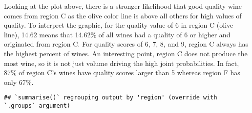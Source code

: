 \documentclass[
]{article}
\newenvironment{Shaded}{\begin{snugshade}}{\end{snugshade}}
\newcommand{\CommentTok}[1]{\textcolor[rgb]{0.56,0.35,0.01}{\textit{#1}}}
\newcommand{\DataTypeTok}[1]{\textcolor[rgb]{0.13,0.29,0.53}{#1}}
\newcommand{\DecValTok}[1]{\textcolor[rgb]{0.00,0.00,0.81}{#1}}
\newcommand{\KeywordTok}[1]{\textcolor[rgb]{0.13,0.29,0.53}{\textbf{#1}}}
\newcommand{\NormalTok}[1]{#1}
\newcommand{\OperatorTok}[1]{\textcolor[rgb]{0.81,0.36,0.00}{\textbf{#1}}}
\newcommand{\StringTok}[1]{\textcolor[rgb]{0.31,0.60,0.02}{#1}}
\begin{document}
Looking at the plot above, there is a stronger likelihood that good
quality wine comes from region C as the olive color line is above all
others for high values of quality. To interpret the graphic, for the
quality value of 6 in region C (olive line), 14.62 means that 14.62\% of
all wines had a quality of 6 or higher and originated from region C. For
quality scores of 6, 7, 8, and 9, region C always has the highest
percent of wines. An interesting point, region C does not produce the
most wine, so it is not just volume driving the high joint
probabilities. In fact, 87\% of region C's wines have quality scores
larger than 5 whereas region F has only 67\%.

\begin{Shaded}
\end{Shaded}

\begin{verbatim}
## `summarise()` regrouping output by 'region' (override with `.groups` argument)
\end{verbatim}

\begin{Shaded}
\end{Shaded}
\end{document}

